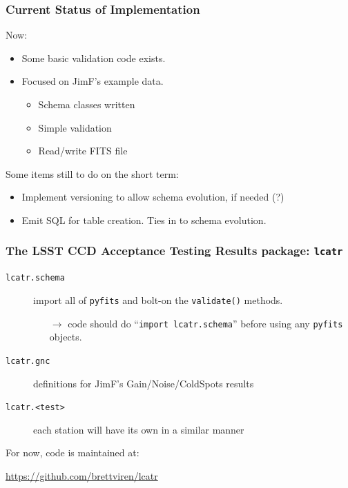 \documentclass[xcolor=dvipsnames]{beamer}
\begin{document}
\begin{frame}
  \frametitle{Current Status of Implementation}

  Now:
  \begin{itemize}
  \item Some basic validation code exists.
  \item Focused on JimF's example data.
    \begin{itemize}
    \item Schema classes written
    \item Simple validation
    \item Read/write FITS file
    \end{itemize}
  \end{itemize}

  \vspace{2mm}

  Some items still to do on the short term:

  \begin{itemize}
  \item Implement versioning to allow schema evolution, if needed (?)
  \item Emit SQL for table creation.  Ties in to schema evolution.
  \end{itemize}

\end{frame}


\begin{frame}[fragile]
  \frametitle{The LSST CCD Acceptance Testing Results package: \texttt{lcatr}}
  \begin{description}
  \item[\texttt{lcatr.schema}] import all of \texttt{pyfits} and
    bolt-on the \texttt{validate()} methods.
    \begin{itemize}
    \item [$\rightarrow$] code should do ``\texttt{import lcatr.schema}'' before using any \texttt{pyfits} objects.
    \end{itemize}
  \item[\texttt{lcatr.gnc}] definitions for JimF's Gain/Noise/ColdSpots results
  \item[\texttt{lcatr.<test>}] each station will have its own in a similar manner
  \end{description}

  For now, code is maintained at:
  \begin{center}
    \url{https://github.com/brettviren/lcatr}    
  \end{center}
\end{frame}
\end{document}

